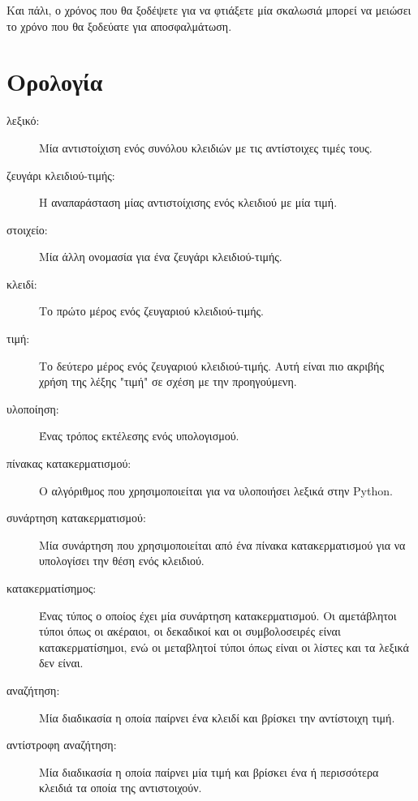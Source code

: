 \documentclass[10pt]{book}
\begin{document}
Και πάλι, ο χρόνος που θα ξοδέψετε για να φτιάξετε μία σκαλωσιά μπορεί να μειώσει το χρόνο που θα ξοδεύατε για αποσφαλμάτωση.

\section{Ορολογία}
 
\begin{description}

\item[λεξικό:] Μία αντιστοίχιση ενός συνόλου κλειδιών με τις αντίστοιχες τιμές τους.

\item[ζευγάρι κλειδιού-τιμής:] Η αναπαράσταση μίας αντιστοίχισης ενός κλειδιού με μία τιμή.

\item[στοιχείο:] Μία άλλη ονομασία για ένα ζευγάρι κλειδιού-τιμής.

\item[κλειδί:] Το πρώτο μέρος ενός ζευγαριού κλειδιού-τιμής.

\item[τιμή:] Το δεύτερο μέρος ενός ζευγαριού κλειδιού-τιμής. Αυτή είναι πιο ακριβής χρήση της λέξης "τιμή" σε σχέση με την προηγούμενη.

\item[υλοποίηση:] Ένας τρόπος εκτέλεσης ενός υπολογισμού.

 \item[πίνακας κατακερματισμού:] Ο αλγόριθμος που χρησιμοποιείται για να υλοποιήσει λεξικά στην Python.

\item[συνάρτηση κατακερματισμού:] Μία συνάρτηση που χρησιμοποιείται από ένα πίνακα κατακερματισμού για να υπολογίσει την θέση ενός κλειδιού.

\item[κατακερματίσημος:] Ένας τύπος ο οποίος έχει μία συνάρτηση κατακερματισμού. Οι αμετάβλητοι τύποι όπως οι ακέραιοι, οι δεκαδικοί και οι συμβολοσειρές είναι κατακερματίσημοι, ενώ οι μεταβλητοί τύποι όπως είναι οι λίστες και τα λεξικά δεν είναι.

\item[αναζήτηση:] Μία διαδικασία η οποία παίρνει ένα κλειδί και βρίσκει την αντίστοιχη τιμή.

\item[αντίστροφη αναζήτηση:] Μία διαδικασία η οποία παίρνει μία τιμή και βρίσκει ένα ή περισσότερα κλειδιά τα οποία της αντιστοιχούν.


\end{description}
\end{document}
